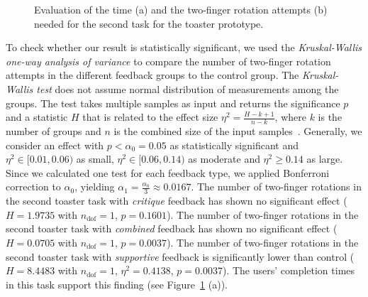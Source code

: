 \documentclass[manuscript]{acmart}
\begin{document}
			\begin{figure}[H]
				\centering
				\caption{Evaluation of the time (a) and the two-finger rotation attempts (b) needed for the second task for the toaster prototype.}
				\label{fig:t2_metrics}
			\end{figure}

			To check whether our result is statistically significant, we used the \emph{Kruskal-Wallis one-way analysis of variance} to compare the number of two-finger rotation attempts in the different feedback groups to the control group. The \emph{Kruskal-Wallis test} does not assume normal distribution of measurements among the groups. The test takes multiple samples as input and returns the significance $p$ and a statistic $H$ that is related to the effect size $\eta^2 = \frac{H-k+1}{n-k}$, where $k$ is the number of groups and $n$ is the combined size of the input samples~\cite{Tomczak2014}. Generally, we consider an effect with $p < \alpha_0 = 0.05$ as statistically significant and $\eta^2 \in [0.01,0.06)$ as small, $\eta^2 \in [0.06,0.14)$ as moderate and $\eta^2 \geq 0.14$ as large. Since we calculated one test for each feedback type, we applied Bonferroni correction to $\alpha_0$, yielding $\alpha_1 = \frac{\alpha_0}{3} \approx 0.0167$. The number of two-finger rotations in the second toaster task with \emph{critique} feedback has shown no significant effect ($H = 1.9735$ with $n_\text{dof} = 1$, $p = 0.1601$). The number of two-finger rotations in the second toaster task with \emph{combined} feedback has shown no significant effect ($H = 0.0705$ with $n_\text{dof} = 1$, $p = 0.0037$). The number of two-finger rotations in the second toaster task with \emph{supportive} feedback is significantly lower than control ($H = 8.4483$ with $n_\text{dof} = 1$, $\eta^2 = 0.4138$, $p = 0.0037$). The users' completion times in this task support this finding (see Figure~\ref{fig:t2_metrics} (a)).
\end{document}
